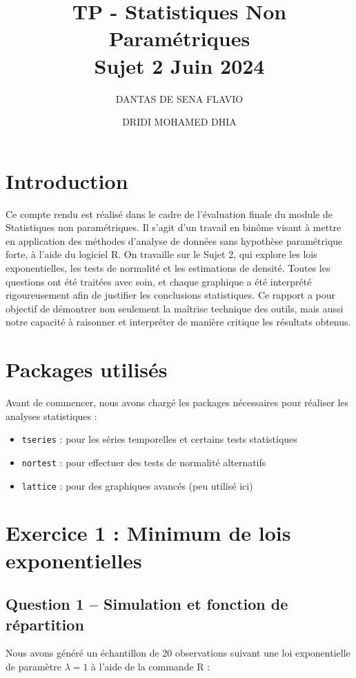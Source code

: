 \documentclass[a4paper,11pt]{article}
\title{TP - Statistiques Non Paramétriques \\ \smallskip \large Sujet 2 \textendash{} Juin 2024}
\author{DANTAS DE SENA FLAVIO \and DRIDI MOHAMED DHIA}
\date{}
\begin{document}
\maketitle

\section*{Introduction}
Ce compte rendu est réalisé dans le cadre de l’évaluation finale du module de Statistiques non paramétriques. Il s’agit d’un travail en binôme visant à mettre en application des méthodes d’analyse de données sans hypothèse paramétrique forte, à l’aide du logiciel R. On travaille sur le Sujet 2, qui explore les lois exponentielles, les tests de normalité et les estimations de densité. Toutes les questions ont été traitées avec soin, et chaque graphique a été interprété rigoureusement afin de justifier les conclusions statistiques. Ce rapport a pour objectif de démontrer non seulement la maîtrise technique des outils, mais aussi notre capacité à raisonner et interpréter de manière critique les résultats obtenus.

\section*{Packages utilisés}
Avant de commencer, nous avons chargé les packages nécessaires pour réaliser les analyses statistiques :
\begin{itemize}
    \item \texttt{tseries} : pour les séries temporelles et certains tests statistiques
    \item \texttt{nortest} : pour effectuer des tests de normalité alternatifs
    \item \texttt{lattice} : pour des graphiques avancés (peu utilisé ici)
\end{itemize}


\newpage

\section*{Exercice 1 : Minimum de lois exponentielles}

\subsection*{Question 1 – Simulation et fonction de répartition}
Nous avons généré un échantillon de 20 observations suivant une loi exponentielle de paramètre $\lambda = 1$ à l’aide de la commande R :
\end{document}
